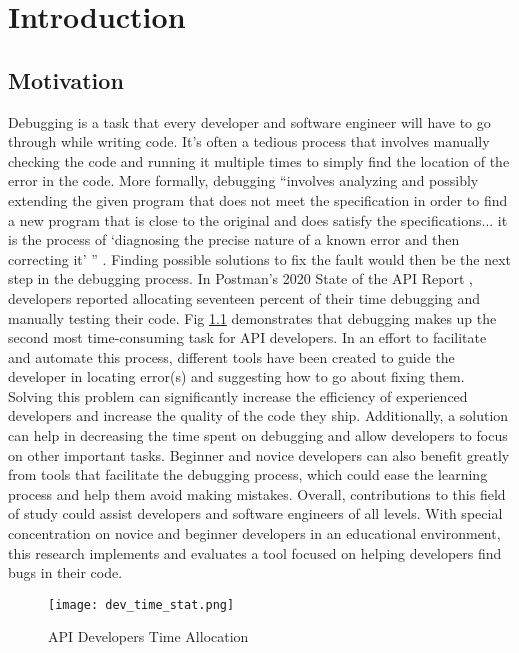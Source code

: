 \chapter{Introduction}
\label{ch:intro}

\section{Motivation}
\label{sec:motivation}

Debugging is a task that every developer and software engineer will have to go
through while writing code. It's often a
tedious process that involves manually checking the code and running it multiple
times to simply find the location of the error in the code. More formally,
debugging ``involves analyzing and possibly extending the given program that
does not meet the specification in order to find a new program that is close to
the original and does satisfy the specifications... it is the process of
`diagnosing the precise nature of a known error and then correcting it' '' \cite{Hailpern2002Debugging}.
Finding possible solutions to fix the fault would then be the next step
in the debugging process. In Postman's 2020 State of the API Report \cite{2020_state_of_api_report},
developers reported allocating seventeen percent of their time
debugging and manually testing their code.
Fig \ref{fig:development_time} demonstrates that debugging makes up the
second most time-consuming task for API developers.
In an effort to facilitate and automate this process, different tools have been
created to guide the developer in locating error(s) and suggesting how to go
about fixing them. Solving this problem can significantly increase the
efficiency of experienced developers and increase the quality of the code they
ship. Additionally, a solution can help in decreasing the time spent on
debugging and allow developers to focus on other important tasks.
Beginner and novice developers can also benefit greatly from tools
that facilitate the debugging process, which could ease the learning process and help
them avoid making mistakes. Overall, contributions to this field of study could
assist developers and software engineers of all levels.
With special concentration on novice and beginner developers in an educational
environment, this research implements and evaluates a tool focused on helping
developers find bugs in their code.

\begin{figure}[!htb]
	\begin{center}
		\texttt{[image: dev\_time\_stat.png]}
		\caption{\label{fig:development_time} API Developers Time Allocation \cite{2020_state_of_api_report}}
	\end{center}
\end{figure}

